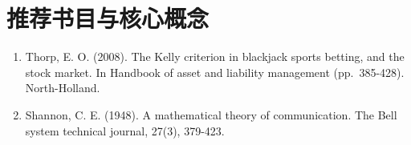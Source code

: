 \documentclass[
  oneside]{book}
\providecommand{\tightlist}{%
  \setlength{\itemsep}{0pt}\setlength{\parskip}{0pt}}
\begin{document}
\hypertarget{ux63a8ux8350ux4e66ux76eeux4e0eux6838ux5fc3ux6982ux5ff5-1}{%
\section{推荐书目与核心概念}\label{ux63a8ux8350ux4e66ux76eeux4e0eux6838ux5fc3ux6982ux5ff5-1}}

\begin{enumerate}
\def\labelenumi{\arabic{enumi}.}
\tightlist
\item
  Thorp, E. O. (2008). The Kelly criterion in blackjack sports betting, and the stock market. In Handbook of asset and liability management (pp.~385-428). North-Holland.
\item
  Shannon, C. E. (1948). A mathematical theory of communication. The Bell system technical journal, 27(3), 379-423.
\end{enumerate}

\printbibliography
\end{document}
